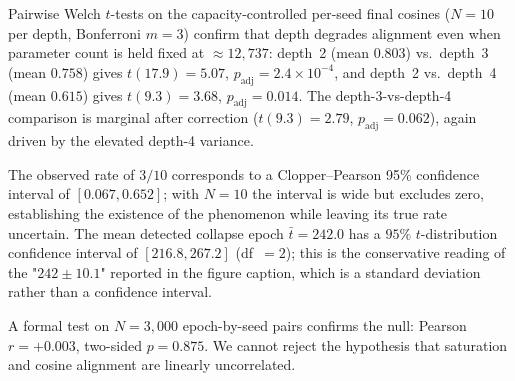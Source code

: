 
Pairwise Welch $t$-tests on the capacity-controlled per-seed final cosines
($N = 10$ per depth, Bonferroni $m = 3$) confirm that depth degrades alignment
even when parameter count is held fixed at $\approx\!12{,}737$:
depth~2 (mean $0.803$) vs.\ depth~3 (mean $0.758$) gives
$t(17.9) = 5.07$, $p_{\mathrm{adj}} = 2.4 \times 10^{-4}$, and depth~2 vs.\
depth~4 (mean $0.615$) gives $t(9.3) = 3.68$, $p_{\mathrm{adj}} = 0.014$.
The depth-3-vs-depth-4 comparison is marginal after correction
($t(9.3) = 2.79$, $p_{\mathrm{adj}} = 0.062$), again driven by the elevated
depth-4 variance.



The observed rate of $3/10$ corresponds to a Clopper--Pearson 95\%
confidence interval of $[0.067, 0.652]$; with $N = 10$ the interval is wide
but excludes zero, establishing the existence of the phenomenon while
leaving its true rate uncertain. The mean detected collapse epoch
$\bar{t} = 242.0$ has a $95\%$ $t$-distribution confidence interval of
$[216.8, 267.2]$ (df~$= 2$); this is the conservative reading of the
"$242 \pm 10.1$" reported in the figure caption, which is a standard
deviation rather than a confidence interval.



A formal test on $N = 3{,}000$ epoch-by-seed pairs confirms the null:
Pearson $r = +0.003$, two-sided $p = 0.875$. We cannot reject the hypothesis
that saturation and cosine alignment are linearly uncorrelated.


